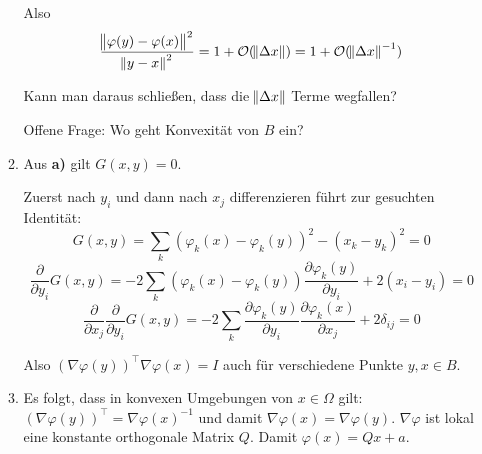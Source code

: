 \documentclass[a4paper,11pt]{scrartcl}
\newcommand*{\Ld}{\mathcal{O}}
\newcommand*{\pyi}[1]{\frac{\partial{#1}}{\partial y_i}}
\newcommand*{\pxj}[1]{\frac{\partial{#1}}{\partial x_j}}
\newcommand*{\Dx}{\Delta{}x}
\begin{document}
\begin{enumerate}[label*=\textbf{9.\arabic*.}]
\begin{enumerate}
Also
\[ \frac{\norm{\varphi(y) - \varphi(x)}^2}{\norm{y - x}^2} = 1 +
  \Ld(\norm{\Dx}) = 1 + \Ld(\norm{\Dx}^{-1}) \]

Kann man daraus schließen, dass die $\norm{\Dx}$ Terme wegfallen?

Offene Frage: Wo geht Konvexität von $B$ ein?

  \item
    Aus \textbf{a)} gilt $G(x, y) = 0$.

    Zuerst nach $y_i$ und dann nach $x_j$ differenzieren führt zur gesuchten Identität:
    \[G(x, y) = \sum_k (\varphi_k(x) - \varphi_k(y))^2 - (x_k - y_k)^2 = 0\]
    \[\pyi{}G(x,y) = -2 \sum_k (\varphi_k(x) - \varphi_k(y)) \pyi{\varphi_k(y)}
      + 2 (x_i - y_i) = 0\]
    \[\pxj{}\pyi{}G(x,y) = -2 \sum_k \pyi{\varphi_k(y)} \pxj{\varphi_k(x)}
      + 2 \delta_{ij} = 0\]

    Also $(\nabla\varphi(y))^\top \nabla\varphi(x) = I$ auch für verschiedene
    Punkte $y, x \in B$.

  \item
    Es folgt, dass in konvexen Umgebungen von $x \in \Omega$ gilt: $(\nabla
    \varphi(y))^\top = \nabla \varphi(x)^{-1}$ und damit $\nabla \varphi(x) =
    \nabla \varphi(y)$. $\nabla\varphi$ ist lokal eine konstante orthogonale
    Matrix $Q$. Damit $\varphi(x) = Q x + a$.

\end{enumerate}

\end{enumerate}
\end{document}
